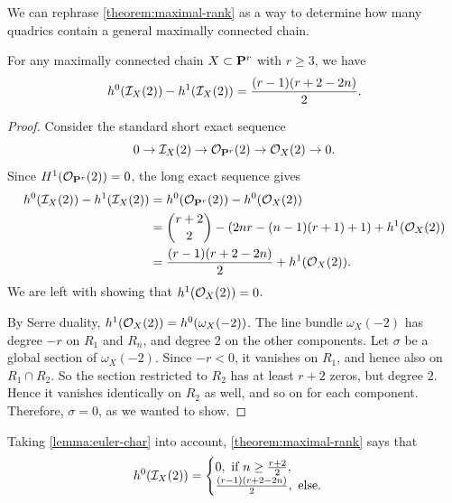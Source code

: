 \documentclass[11pt, two side, letterpaper, final]{amsart}
\renewcommand{\P}{{\bf P}}
\begin{document}
We can rephrase \cref{theorem:maximal-rank} as a way to determine how many quadrics contain a general maximally connected chain.
\begin{lemma}
\label{lemma:euler-char}
For any maximally connected chain $X \subset \P^r$ with $r \geq 3$, we have
\[
	h^0({\mathcal I}_X(2))-h^1({\mathcal I}_X(2)) = \frac{(r-1)(r+2-2n)}{2}.
\]
\end{lemma}
\begin{proof}
Consider the standard short exact sequence
\[
	0 \to \sh{I}_X(2) \to \sh{O}_{\P^r}(2) \to \sh{O}_{X}(2) \to 0.
\]
Since $H^1(\sh{O}_{\P^r}(2))=0$, the long exact sequence gives
\begin{align*}
	h^0(\sh{I}_X(2))-h^1(\sh{I}_X(2)) &= h^0(\sh{O}_{\P^r}(2)) - h^0(\sh{O}_{X}(2)) \\
	&= \binom{r+2}{2} - (2nr-(n-1)(r+1)+1) +h^1(\sh{O}_X(2)) \\
	&= \frac{(r-1)(r+2-2n)}{2} +h^1(\sh{O}_X(2)).
\end{align*}
We are left with showing that $h^1({\mathcal O}_X(2))=0$. 

By Serre duality, 
$h^1({\mathcal O}_X(2)) = h^0(\omega_X(-2))$. The line bundle $\omega_X(-2)$
has degree $-r$ on $R_1$ and $R_n$, and degree $2$ on the other components.
Let $\sigma$ be a global section of $\omega_X(-2)$.
Since $-r<0$, it vanishes on $R_1$, and hence also on $R_1 \cap R_2$. So 
the section restricted to $R_2$ has at least $r+2$ zeros, but degree $2$. Hence it
vanishes identically on $R_2$ as well, and so on for each component. Therefore, $\sigma=0$,
as we wanted to show.
\end{proof}

Taking \cref{lemma:euler-char} into account, \cref{theorem:maximal-rank} says that 
\begin{equation}\label{dim:quad}
	h^0({\mathcal I}_X(2))= \begin{cases}
	0, \text{ if }  n \geq \frac{r+2}{2},\\
	\frac{(r-1)(r+2-2n)}{2}, \text{ else.}
	\end{cases}
\end{equation}
\end{document}
